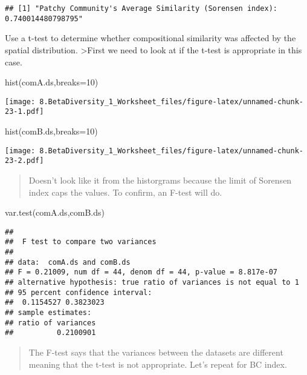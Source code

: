 \documentclass[
]{article}
\newenvironment{Shaded}{\begin{snugshade}}{\end{snugshade}}
\newcommand{\AttributeTok}[1]{\textcolor[rgb]{0.77,0.63,0.00}{#1}}
\newcommand{\DecValTok}[1]{\textcolor[rgb]{0.00,0.00,0.81}{#1}}
\newcommand{\FunctionTok}[1]{\textcolor[rgb]{0.00,0.00,0.00}{#1}}
\newcommand{\NormalTok}[1]{#1}
\begin{document}
\begin{verbatim}
## [1] "Patchy Community's Average Similarity (Sorensen index): 0.740014480798795"
\end{verbatim}

Use a t-test to determine whether compositional similarity was affected
by the spatial distribution. \textgreater First we need to look at if
the t-test is appropriate in this case.

\begin{Shaded}
\begin{Highlighting}[]
\FunctionTok{hist}\NormalTok{(comA.ds,}\AttributeTok{breaks=}\DecValTok{10}\NormalTok{)}
\end{Highlighting}
\end{Shaded}

\texttt{[image: 8.BetaDiversity\_1\_Worksheet\_files/figure-latex/unnamed-chunk-23-1.pdf]}

\begin{Shaded}
\begin{Highlighting}[]
\FunctionTok{hist}\NormalTok{(comB.ds,}\AttributeTok{breaks=}\DecValTok{10}\NormalTok{)}
\end{Highlighting}
\end{Shaded}

\texttt{[image: 8.BetaDiversity\_1\_Worksheet\_files/figure-latex/unnamed-chunk-23-2.pdf]}

\begin{quote}
Doesn't look like it from the historgrams because the limit of Sorensen
index caps the values. To confirm, an F-test will do.
\end{quote}

\begin{Shaded}
\begin{Highlighting}[]
\FunctionTok{var.test}\NormalTok{(comA.ds,comB.ds)}
\end{Highlighting}
\end{Shaded}

\begin{verbatim}
## 
##  F test to compare two variances
## 
## data:  comA.ds and comB.ds
## F = 0.21009, num df = 44, denom df = 44, p-value = 8.817e-07
## alternative hypothesis: true ratio of variances is not equal to 1
## 95 percent confidence interval:
##  0.1154527 0.3823023
## sample estimates:
## ratio of variances 
##          0.2100901
\end{verbatim}

\begin{quote}
The F-test says that the variances between the datasets are different
meaning that the t-test is not appropriate. Let's repeat for BC index.
\end{quote}
\end{document}
